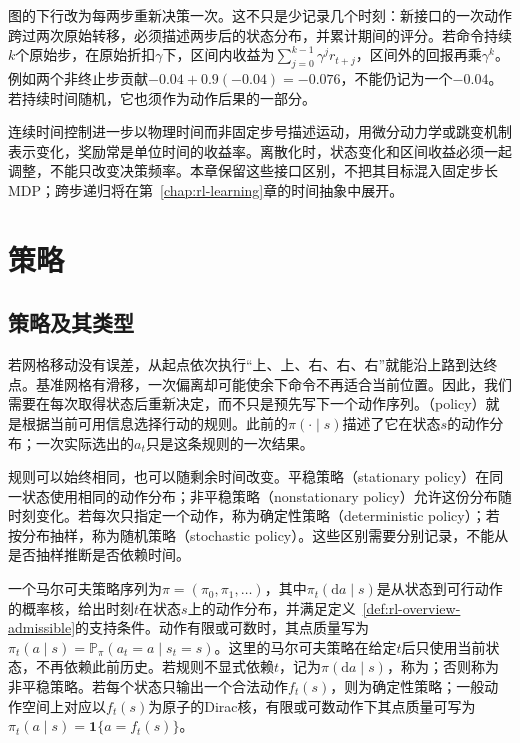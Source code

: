图的下行改为每两步重新决策一次。这不只是少记录几个时刻：新接口的一次动作跨过两次原始转移，必须描述两步后的状态分布，并累计期间的评分。若命令持续$k$个原始步，在原始折扣$\gamma$下，区间内收益为$\sum_{j=0}^{k-1}\gamma^j r_{t+j}$，区间外的回报再乘$\gamma^k$。例如两个非终止步贡献$-0.04+0.9(-0.04)=-0.076$，不能仍记为一个$-0.04$。若持续时间随机，它也须作为动作后果的一部分。

连续时间控制进一步以物理时间而非固定步号描述运动，用微分动力学或跳变机制表示变化，奖励常是单位时间的收益率。离散化时，状态变化和区间收益必须一起调整，不能只改变决策频率。本章保留这些接口区别，不把其目标混入固定步长MDP；跨步递归将在第~\ref{chap:rl-learning}章的时间抽象中展开。

\section{策略}
\label{sec:rl-overview-policies}

\subsection{策略及其类型}
\label{sec:rl-overview-policy-types}

若网格移动没有误差，从起点依次执行“上、上、右、右、右”就能沿上路到达终点。基准网格有滑移，一次偏离却可能使余下命令不再适合当前位置。因此，我们需要在每次取得状态后重新决定，而不只是预先写下一个动作序列。（policy）就是根据当前可用信息选择行动的规则。此前的$\pi(\cdot\mid s)$描述了它在状态$s$的动作分布；一次实际选出的$a_t$只是这条规则的一次结果。

规则可以始终相同，也可以随剩余时间改变。平稳策略（stationary policy）在同一状态使用相同的动作分布；非平稳策略（nonstationary policy）允许这份分布随时刻变化。若每次只指定一个动作，称为确定性策略（deterministic policy）；若按分布抽样，称为随机策略（stochastic policy）。这些区别需要分别记录，不能从是否抽样推断是否依赖时间。

\begin{definition}[马尔可夫策略]
  \label{def:rl-overview-policy}
  一个马尔可夫策略序列为$\pi=(\pi_0,\pi_1,\ldots)$，其中$\pi_t(\mathrm da\mid s)$是从状态到可行动作的概率核，给出时刻$t$在状态$s$上的动作分布，并满足定义~\ref{def:rl-overview-admissible}的支持条件。动作有限或可数时，其点质量写为$\pi_t(a\mid s)=\mathbb P_\pi(a_t=a\mid s_t=s)$。这里的马尔可夫策略在给定$t$后只使用当前状态，不再依赖此前历史。若规则不显式依赖$t$，记为$\pi(\mathrm da\mid s)$，称为；否则称为非平稳策略。若每个状态只输出一个合法动作$f_t(s)$，则为确定性策略；一般动作空间上对应以$f_t(s)$为原子的Dirac核，有限或可数动作下其点质量可写为$\pi_t(a\mid s)=\mathbf 1\{a=f_t(s)\}$。
\end{definition}

